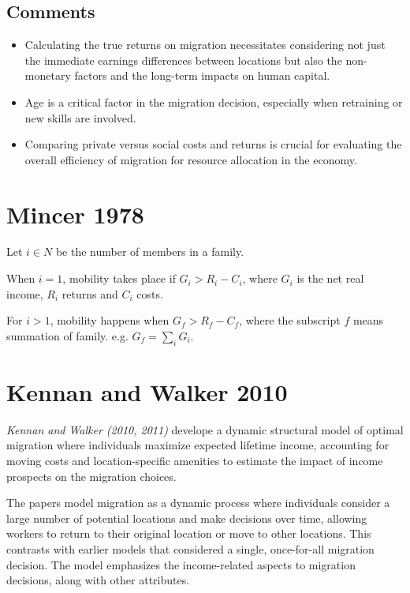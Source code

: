 \documentclass{article}
\numberwithin{equation}{section} %
\begin{document}
\subsection{Comments} %
\label{sub:comments}
\begin{itemize}
  \item Calculating the true returns on migration necessitates considering not just the immediate earnings differences between locations but also the non-monetary factors and the long-term impacts on human capital.
  \item Age is a critical factor in the migration decision, especially when retraining or new skills are involved.
  \item Comparing private versus social costs and returns is crucial for evaluating the overall efficiency of migration for resource allocation in the economy.
\end{itemize}

\section{Mincer 1978} %
\label{sec:mincer_1978}

Let $i\in N$ be the number of members in a family.

When $i=1$, mobility takes place if $G_i>R_i-C_i$, where $G_i$ is the net real income, $R_i$ returns and $C_i$ costs.

For $i>1$, mobility happens when $G_f>R_f-C_f$, where the subscript $f$ means summation of family. e.g. $G_f=\sum\limits_{i}^{}G_i$.





\section{Kennan and Walker 2010} %
\label{sec:kennan_and_walker}

\textit{Kennan and Walker (2010, 2011)} develope a dynamic structural model of optimal migration where individuals maximize expected lifetime income, accounting for moving costs and location-specific amenities to estimate the impact of income prospects on the migration choices.

The papers model migration as a dynamic process where individuals consider a large number of potential locations and make decisions over time, allowing workers to return to their original location or move to other locations. This contrasts with earlier models that considered a single, once-for-all migration decision. The model emphasizes the income-related aspects to migration decisions, along with other attributes.
\end{document}
